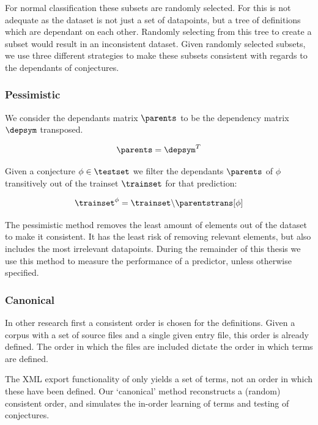 
For normal classification these subsets are randomly selected.
For \premiseselection this is not adequate as the dataset is not just a set of datapoints, but a tree of definitions which are dependant on each other.
Randomly selecting from this tree to create a subset would result in an inconsistent dataset.
Given randomly selected subsets, we use three different strategies to make these subsets consistent with regards to the dependants of conjectures.

\subsubsection{Pessimistic}
We consider the dependants matrix $\parents$ to be the dependency matrix $\depsym$ transposed.
\begin{definition}
  \[
    \parents = \depsym^{T}
  \]
\end{definition}

Given a conjecture $\phi \in \testset$ we filter the dependants $\parents$ of $\phi$ transitively out of the trainset $\trainset$ for that prediction:
\begin{definition}
  \[
    \trainset^{\phi} = \trainset \backslash \parentstrans[\phi]
  \]
\end{definition}
The pessimistic method removes the least amount of elements out of the dataset to make it consistent.
It has the least risk of removing relevant elements, but also includes the most irrelevant datapoints.
During the remainder of this thesis we use this method to measure the performance of a predictor, unless otherwise specified.

\subsubsection{Canonical}
In other research first a consistent order is chosen for the definitions.
Given a corpus with a set of source files and a single given entry file, this order is already defined.
The order in which the files are included dictate the order in which terms are defined.

The XML export functionality of \coq only yields a set of terms, not an order in which these have been defined.
Our `canonical' method reconstructs a (random) consistent order, and simulates the in-order learning of terms and testing of conjectures.

